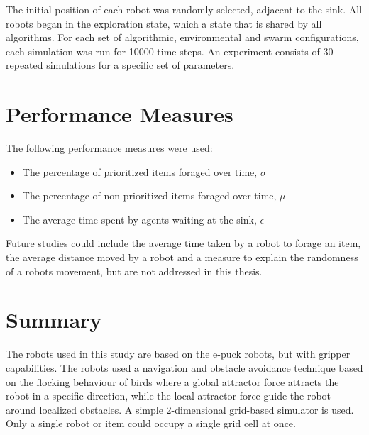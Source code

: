 The initial position of each robot was randomly selected, adjacent to the sink. All robots began in the exploration state, which a state that is shared by all algorithms. For each set of algorithmic, environmental and swarm configurations, each simulation was run for 10000 time steps. An experiment consists of 30 repeated simulations for a specific set of parameters.

\section{Performance Measures}
\label{thri:third:performancemeasures}

The following performance measures were used: 

	\begin{itemize}
		\item	The percentage of prioritized items foraged over time,  $\sigma$ 
		\item	The percentage of non-prioritized items foraged over time, $\mu$
		\item   The average time spent by agents waiting at the sink, $\epsilon$
	\end{itemize}
	
Future studies could include the average time taken by a robot to forage an item, the average distance moved by a robot and a measure to explain the randomness of a robots movement, but are not addressed in this thesis. 




\section{Summary}
\label{third:summary}
The robots used in this study are based on the e-puck robots, but with gripper capabilities. The robots used a navigation and obstacle avoidance technique based on the flocking behaviour of birds where a global attractor force attracts the robot in a specific direction, while the local attractor force guide the robot around localized obstacles. A simple 2-dimensional grid-based simulator is used. Only a single robot or item could occupy a single grid cell at once.

